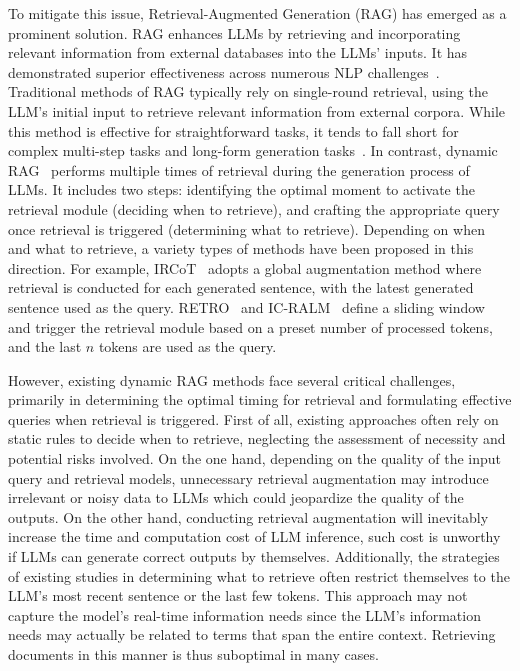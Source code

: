 To mitigate this issue, Retrieval-Augmented Generation (RAG) has emerged as a prominent solution. 
RAG enhances LLMs by retrieving and incorporating relevant information from external databases into the LLMs' inputs. 
It has demonstrated superior effectiveness across numerous NLP challenges~\cite{khandelwal2019generalization,borgeaud2022improving,lewis2020retrieval,guu2020retrieval,izacard2020leveraging,jiang2022retrieval,shi2023replug}. 
Traditional methods of RAG typically rely on single-round retrieval, using the LLM's initial input to retrieve relevant information from external corpora. 
While this method is effective for straightforward tasks, it tends to fall short for complex multi-step tasks and long-form generation tasks~\cite{jiang2023active}. 
In contrast, dynamic RAG~\cite{trivedi2022interleaving,borgeaud2022improving,ram2023context,jiang2023active} performs multiple times of retrieval during the generation process of LLMs. 
It includes two steps: identifying the optimal moment to activate the retrieval module (deciding when to retrieve), and crafting the appropriate query once retrieval is triggered (determining what to retrieve).
Depending on when and what to retrieve, a variety types of methods have been proposed in this direction.
For example, IRCoT~\cite{trivedi2022interleaving} adopts a global augmentation method where retrieval is conducted for each generated sentence, with the latest generated sentence used as the query. 
RETRO~\cite{borgeaud2022improving} and IC-RALM~\cite{ram2023context} define a sliding window and trigger the retrieval module based on a preset number of processed tokens, and the last $n$ tokens are used as the query. 

However, existing dynamic RAG methods face several critical challenges, primarily in determining the optimal timing for retrieval and formulating effective queries when retrieval is triggered. 
First of all, existing approaches often rely on static rules to decide when to retrieve, neglecting the assessment of necessity and potential risks involved.
On the one hand, depending on the quality of the input query and retrieval models, unnecessary retrieval augmentation may introduce irrelevant or noisy data to LLMs which could jeopardize the quality of the outputs. 
On the other hand, conducting retrieval augmentation will inevitably increase the time and computation cost of LLM inference, such cost is unworthy if LLMs can generate correct outputs by themselves.
Additionally, the strategies of existing studies in determining what to retrieve often restrict themselves to the LLM's most recent sentence or the last few tokens. 
This approach may not capture the model's real-time information needs since the LLM's information needs may actually be related to terms that span the entire context. Retrieving documents in this manner is thus suboptimal in many cases.

